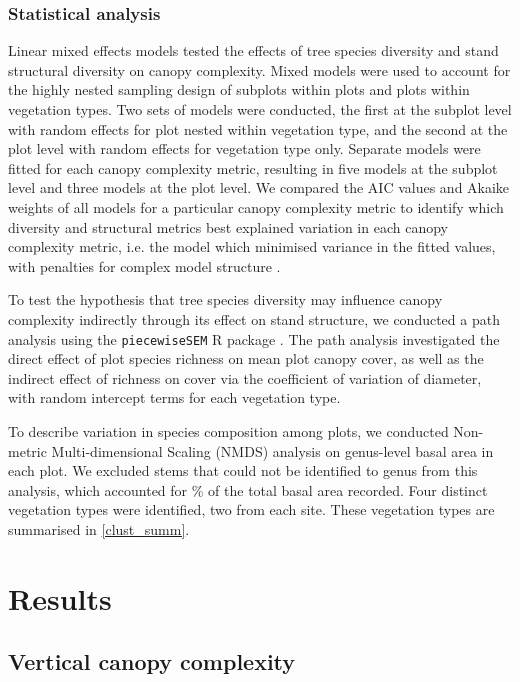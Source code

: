 \documentclass[11pt,a4paper]{article}
\begin{document}
\subsubsection{Statistical analysis}

Linear mixed effects models tested the effects of tree species diversity and stand structural diversity on canopy complexity. Mixed models were used to account for the highly nested sampling design of subplots within plots and plots within vegetation types. Two sets of models were conducted, the first at the subplot level with random effects for plot nested within vegetation type, and the second at the plot level with random effects for vegetation type only. Separate models were fitted for each canopy complexity metric, resulting in five models at the subplot level and three models at the plot level. We compared the AIC values and Akaike weights of all models for a particular canopy complexity metric to identify which diversity and structural metrics best explained variation in each canopy complexity metric, i.e. the model which minimised variance in the fitted values, with penalties for complex model structure \citep{Akaike1992}. 

To test the hypothesis that tree species diversity may influence canopy complexity indirectly through its effect on stand structure, we conducted a path analysis using the \texttt{piecewiseSEM} R package \citep{}. The path analysis investigated the direct effect of plot species richness on mean plot canopy cover, as well as the indirect effect of richness on cover via the coefficient of variation of diameter, with random intercept terms for each vegetation type.

To describe variation in species composition among plots, we conducted Non-metric Multi-dimensional Scaling (NMDS) analysis on genus-level basal area in each plot. We excluded stems that could not be identified to genus from this analysis, which accounted for \perIndet{}\% of the total basal area recorded. Four distinct vegetation types were identified, two from each site. These vegetation types are summarised in \autoref{clust_summ}.

%

\section{Results}

\subsection{Vertical canopy complexity}
\end{document}
